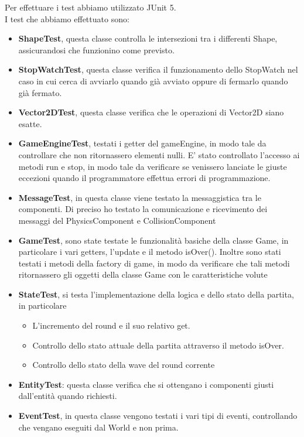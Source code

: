 \documentclass[a4paper,12pt]{report}
\begin{document}
Per effettuare i test abbiamo utilizzato JUnit 5.
\\I test che abbiamo effettuato sono:
\begin{itemize}
	\item \textbf{ShapeTest}, questa classe controlla le intersezioni tra i differenti Shape, assicurandosi che funzionino come previsto.
	\item \textbf{StopWatchTest}, questa classe verifica il funzionamento dello StopWatch nel caso in cui cerca di avviarlo quando già avviato oppure di fermarlo quando già fermato.
	\item \textbf{Vector2DTest}, questa classe verifica che le operazioni di Vector2D siano esatte.
	\item \textbf{GameEngineTest}, testati i getter del gameEngine, in modo tale da controllare che non ritornassero elementi nulli. E' stato controllato l'accesso ai metodi run e stop, in modo tale da verificare se venissero lanciate le giuste eccezioni quando il programmatore effettua errori di programmazione.
	\item \textbf{MessageTest}, in questa classe viene testato la messaggistica tra le componenti. Di preciso ho testato la comunicazione e ricevimento dei messaggi del PhysicsComponent e CollisionComponent
	\item \textbf{GameTest}, sono state testate le funzionalità basiche della classe Game, in particolare i vari getters, l'update e il metodo isOver(). Inoltre sono stati testati i metodi della factory di game, in modo da verificare che tali metodi ritornassero gli oggetti della classe Game con le caratteristiche volute
	\item \textbf{StateTest}, si testa l'implementazione della logica e dello stato della partita, in particolare 
        \begin{itemize}
    	    \item L'incremento del round e il suo relativo get.
            \item Controllo dello stato attuale della partita attraverso il metodo isOver. 
            \item Controllo dello stato della wave del round corrente
    	\end{itemize}
	\item \textbf{EntityTest}: questa classe verifica che si ottengano i componenti giusti dall’entità quando richiesti.
	\item \textbf{EventTest}, in questa classe vengono testati i vari tipi di eventi, controllando che vengano eseguiti dal World e non prima.

\end{itemize}
\end{document}
